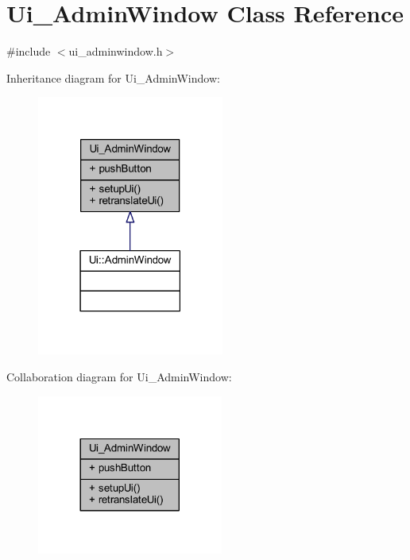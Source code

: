 \hypertarget{class_ui___admin_window}{}\section{Ui\+\_\+\+Admin\+Window Class Reference}
\label{class_ui___admin_window}


{\ttfamily \#include $<$ui\+\_\+adminwindow.\+h$>$}



Inheritance diagram for Ui\+\_\+\+Admin\+Window\+:\nopagebreak
\begin{figure}[H]
\begin{center}
\leavevmode
\includegraphics[width=174pt]{class_ui___admin_window__inherit__graph}
\end{center}
\end{figure}


Collaboration diagram for Ui\+\_\+\+Admin\+Window\+:\nopagebreak
\begin{figure}[H]
\begin{center}
\leavevmode
\includegraphics[width=173pt]{class_ui___admin_window__coll__graph}
\end{center}
\end{figure}
